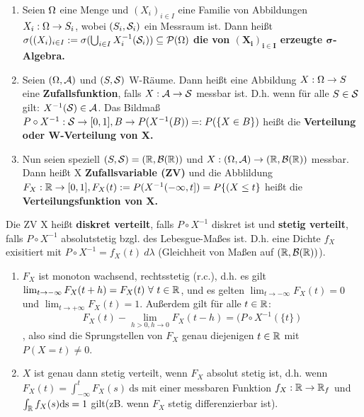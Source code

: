 \documentclass[parskip = full, 12pt]{scrartcl}
\begin{document}
\label{ss: Definition 4.1}
	\begin{enumerate}
		\item Seien $\Omega$ eine Menge und $(X_i)_{i \in I}$ eine Familie von 
			Abbildungen $X_i:\Omega \rightarrow S_i$, wobei $(S_i, \mathcal{S}_i)$ ein Messraum
			ist. Dann heißt $\sigma((X_i)_{i \in I} := \sigma(\bigcup_{i \in I} 
			X_i^{-1} (\mathcal{S}_i)) \subseteq \mathcal{P}(\Omega)$ \textbf{die von $\bm{(X_i)_{i  
			\in I}}$ erzeugte $\bm{\sigma}$-Algebra.}
		\item Seien $(\Omega, \mathcal{A})$ und $(S,\mathcal{S})$ W-Räume. Dann heißt eine Abbildung 
			$X: \Omega \rightarrow S$ eine \textbf{Zufallsfunktion}, falls $X:\mathcal{A} 
			\rightarrow \mathcal{S}$ messbar ist. D.h. wenn für alle $S \in \mathcal{S}$ gilt: $X^{-1}
			(\mathcal{S}) \in \mathcal{A}$. Das Bildmaß $P \circ X^{-1}: \mathcal{S} \rightarrow [0,1], B 
			\rightarrow  P(X^{-1}(B)) =: P(\{ X \in B \})$ heißt die \textbf{
			Verteilung oder W-Verteilung von X.}
		\item Nun seien speziell $(S, \mathcal{S}) = (\mathbb{R}, \mathcal{B}(\mathbb{R}))$ und $X:(\Omega, \mathcal{A})
			\rightarrow (\mathbb{R}, \mathcal{B}(\mathbb{R}))$ messbar. Dann heißt X \textbf{
			Zufallsvariable (ZV)}  und die Abblildung $F_X:\mathbb{R} \rightarrow [0,1], 
			F_X(t) := P(X^{-1}(-\infty, t]) = P\{ (X \leq t \}$ heißt die 
			\textbf{Verteilungsfunktion von X.}
	\end{enumerate}

	Die ZV X heißt \textbf{diskret verteilt}, falls $P \circ X^{-1}$ diskret ist
	und \textbf{stetig verteilt}, falls $P \circ X^{-1}$ absolutstetig bzgl. des 
	Lebesgue-Maßes ist. D.h. eine Dichte $f_X$ exisitiert mit $P \circ X^{-1} = 
	f_X(t)\ d\lambda$ (Gleichheit von Maßen auf $(\mathbb{R}, \mathcal{B}(\mathbb{R}))$).

\label{ss: Bemerkung 4.2}
	\begin{enumerate}
		\item $F_X$ ist monoton wachsend, rechtsstetig (r.c.), d.h. es gilt 
			$\lim_{t \rightarrow -\infty} F_X(t+h) = F_X(t)\ \forall\ t \in \Real$, 
			und es gelten $\lim_{t \rightarrow -\infty} F_X(t) = 0$ und $\lim_{t 
			\rightarrow + \infty} F_X(t) = 1$. Außerdem gilt für alle $t \in \mathbb{R}$: 
			$$ F_X(t) - \lim_{h > 0, h \rightarrow 0} F_X(t-h) = (P \circ X^{-1}(\{ 
			t\})$$, 
			also sind die Sprungstellen von $F_X$ genau diejenigen $t \in \mathbb{R}$ mit
			$P({X = t}) \neq 0$. 
		\item $X$ ist genau dann stetig verteilt, wenn $F_X$ absolut stetig ist,
			d.h. wenn $F_X(t) = \int_{-\infty}^t F_X(s)\ \textrm{ds}$ mit einer  
			messbaren Funktion $f_X: \mathbb{R} \rightarrow \mathbb{R}_f$ und $\int_{\mathbb{R}} f_X(s)
			\textrm{ds} = 1$ gilt(zB. wenn $F_X$ stetig differenzierbar ist).
	\end{enumerate}
\end{document}
